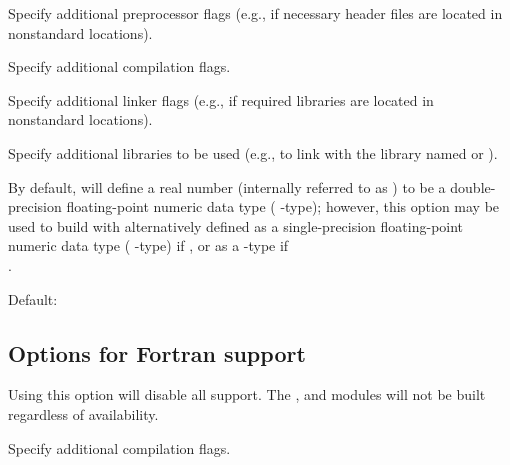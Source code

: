 \begin{config}
\item {}

  Specify additional {\C} preprocessor flags 
  (e.g.,  if necessary header files are located in nonstandard locations).

\item {}

  Specify additional {\C} compilation flags.

\item {}

  Specify additional linker flags 
  (e.g.,  if required libraries are located in nonstandard locations).

\item {}

  Specify additional libraries to be used 
  (e.g.,  to link with the library named  or ).

\item {}

  By default, {\sundials} will define a real number (internally referred to as
  ) to be a double-precision floating-point numeric data type (
  {\C}-type); however, this option may be used to build {\sundials} with 
  alternatively defined as a single-precision floating-point numeric data type
  ( {\C}-type) if , or as a  {\C}-type
  if \\ .

  Default: 

\end{config}


\subsection*{Options for Fortran support}

\begin{config}

\item {}

  Using this option will disable all {\F} support. The {\fcvode}, {\fkinsol} and
  {\fnvector} modules will not be built regardless of availability.

\item {}

  Specify additional {\F} compilation flags.

\end{config}

